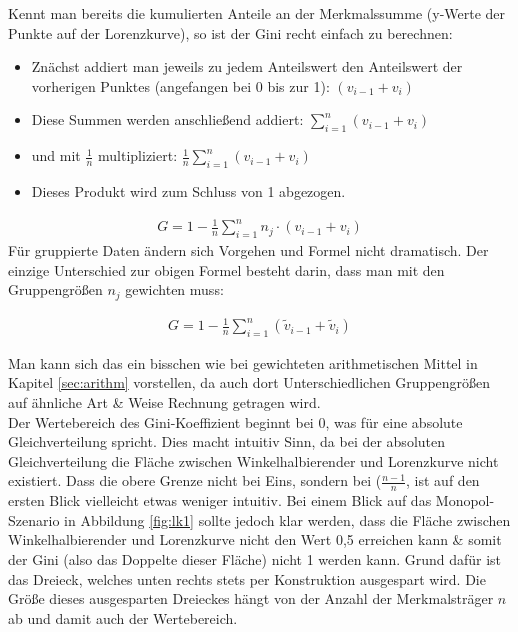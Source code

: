 \documentclass[a4paper]{article}
\begin{document}
\noindent Kennt man bereits die kumulierten Anteile an der Merkmalssumme (y-Werte der Punkte auf der Lorenzkurve), so ist der Gini recht einfach zu berechnen:
\begin{itemize}
    \item Znächst addiert man jeweils zu jedem Anteilswert den Anteilswert der vorherigen Punktes (angefangen bei 0 bis zur 1): $(v_{i-1}+v_i)$
    \item Diese Summen werden anschließend addiert: $\sum_{i=1}^n (v_{i-1}+v_i)$
    \item und mit $\frac{1}{n}$ multipliziert: $\frac{1}{n}\sum_{i=1}^n (v_{i-1}+v_i)$
    \item Dieses Produkt wird zum Schluss von 1 abgezogen.
\end{itemize}
\begin{align*}
    G=1-\frac{1}{n}\sum_{i=1}^n n_j \cdot (v_{i-1} + v_i)
\end{align*}
Für gruppierte Daten ändern sich Vorgehen und Formel nicht dramatisch. Der einzige Unterschied zur obigen Formel besteht darin, dass man mit den Gruppengrößen $n_j$ gewichten muss:

\begin{align*}
    G=1-\frac{1}{n}\sum_{i=1}^n (\tilde v_{i-1} + \tilde v_i)
\end{align*}

\noindent Man kann sich das ein bisschen wie bei gewichteten arithmetischen Mittel in Kapitel \ref{sec:arithm} vorstellen, da auch dort Unterschiedlichen Gruppengrößen auf ähnliche Art \& Weise Rechnung getragen wird.\\

\noindent Der Wertebereich des Gini-Koeffizient beginnt bei 0, was für eine absolute Gleichverteilung spricht. Dies macht intuitiv Sinn, da bei der absoluten Gleichverteilung die Fläche zwischen Winkelhalbierender und Lorenzkurve nicht existiert. Dass die obere Grenze nicht bei Eins, sondern bei ($\frac{n-1}{n}$, ist auf den ersten Blick vielleicht etwas weniger intuitiv. Bei einem Blick auf das Monopol-Szenario in Abbildung \ref{fig:lk1} sollte jedoch klar werden, dass die Fläche zwischen Winkelhalbierender und Lorenzkurve nicht den Wert 0,5 erreichen kann \& somit der Gini (also das Doppelte dieser Fläche) nicht 1 werden kann. Grund dafür ist das Dreieck, welches unten rechts stets per Konstruktion ausgespart wird. Die Größe dieses ausgesparten Dreieckes hängt von der Anzahl der Merkmalsträger $n$ ab und damit auch der Wertebereich.\\
\end{document}
